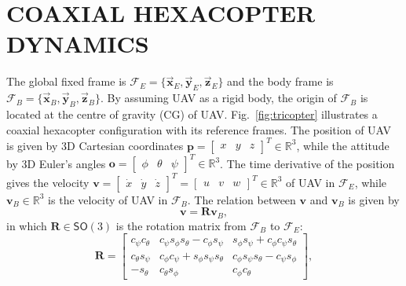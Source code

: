 \section{COAXIAL HEXACOPTER DYNAMICS}
\label{sec:model}

The global fixed frame is $\mathcal{F}_E = \{\vec{\mathbf{x}}_E, \vec{\mathbf{y}}_E, \vec{\mathbf{z}}_E\}$ and the body frame is $\mathcal{F}_B = \{\vec{\mathbf{x}}_B, \vec{\mathbf{y}}_B, \vec{\mathbf{z}}_B\}$. By assuming UAV as a rigid body, the origin of $\mathcal{F}_B$ is located at the centre of gravity (CG) of UAV. Fig.~\ref{fig:tricopter} illustrates a coaxial hexacopter configuration with its reference frames. The position of UAV is given by 3D Cartesian coordinates $\mathbf{p} = \begin{bmatrix} x & y & z \end{bmatrix}^T \in \mathbb{R}^3$, while the attitude by 3D Euler's angles $\mathbf{o} = \begin{bmatrix} \phi & \theta & \psi\end{bmatrix}^T \in \mathbb{R}^3$. The time derivative of the position gives the velocity $\mathbf{v} = \begin{bmatrix}\dot{x} & \dot{y} & \dot{z}\end{bmatrix}^T = \begin{bmatrix} u & v & w \end{bmatrix}^T \in \mathbb{R}^3$ of UAV in $\mathcal{F}_E$, while $\mathbf{v}_B \in \mathbb{R}^3$ is the velocity of UAV in $\mathcal{F}_B$. The relation between $\mathbf{v}$ and $\mathbf{v}_B$ is given by
\begin{equation}
\mathbf{v} = \mathbf{R} \mathbf{v}_B,
\label{eq:linear_velocity}
\end{equation}
in which $\mathbf{R} \in \mathsf{SO}(3)$ is the rotation matrix from $\mathcal{F}_B$ to $\mathcal{F}_E$:
\begin{equation}
\mathbf{R} = \begin{bmatrix}c_{\psi} c_{\theta} & c_{\psi} s_{\phi} s_{\theta} - c_{\phi} s_{\psi} & s_{\phi} s_{\psi} + c_{\phi} c_{\psi} s_{\theta} \\ c_{\theta} s_{\psi} & c_{\phi} c_{\psi} + s_{\phi} s_{\psi} s_{\theta} & c_{\phi} s_{\psi} s_{\theta} - c_{\psi} s_{\phi} \\ -s_{\theta} & c_{\theta} s_{\phi} & c_{\phi} c_{\theta}\end{bmatrix},
\label{eq:rotation_matrix}
\end{equation}
